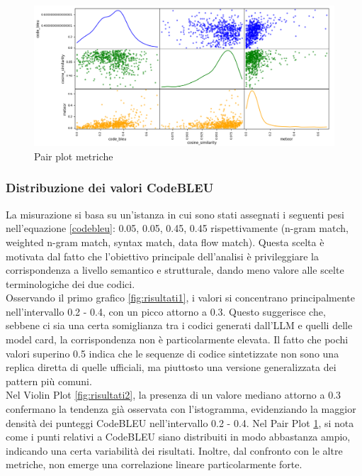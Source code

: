 \documentclass{article}
\begin{document}
\begin{figure}[htbp]
    \centering
    \includegraphics[width=\textwidth]{images/risultati3.png}
    \caption{Pair plot metriche}
    \label{fig:risultati3}
\end{figure}

\subsubsection{Distribuzione dei valori CodeBLEU}
La misurazione si basa su un'istanza in cui sono stati assegnati i seguenti pesi nell'equazione \ref{codebleu}: 0.05, 0.05, 0.45, 0.45 rispettivamente (n-gram match, weighted n-gram match, syntax match, data flow match). Questa scelta è motivata dal fatto che l’obiettivo principale dell’analisi è privileggiare la corrispondenza a livello semantico e strutturale, dando meno valore alle scelte terminologiche dei due codici.\\
Osservando il primo grafico \ref{fig:risultati1}, i valori si concentrano principalmente nell’intervallo 0.2 - 0.4, con un picco attorno a 0.3. Questo suggerisce che, sebbene ci sia una certa somiglianza tra i codici generati dall’LLM e quelli delle model card, la corrispondenza non è particolarmente elevata. Il fatto che pochi valori superino 0.5 indica che le sequenze di codice sintetizzate non sono una replica diretta di quelle ufficiali, ma piuttosto una versione generalizzata dei pattern più comuni.\\
Nel Violin Plot \ref{fig:risultati2}, la presenza di un valore mediano attorno a 0.3 confermano la tendenza già osservata con l’istogramma, evidenziando la maggior densità dei punteggi CodeBLEU nell’intervallo 0.2 - 0.4. Nel Pair Plot \ref{fig:risultati3}, si nota come i punti relativi a CodeBLEU siano distribuiti in modo abbastanza ampio, indicando una certa variabilità dei risultati. Inoltre, dal confronto con le altre metriche, non emerge una correlazione lineare particolarmente forte.
\end{document}
